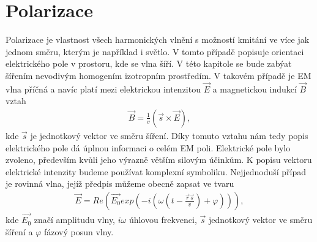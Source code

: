 \chapter{Polarizace}
Polarizace je vlastnost všech harmonických vlnění s možností kmitání ve více jak jednom směru, kterým je například i světlo. V tomto případě popisuje orientaci elektrického pole v prostoru, kde se vlna šíří. V této kapitole se bude zabýat šířením nevodivým homogením izotropním prostředím. V takovém případě je EM vlna příčná a navíc platí mezi elektrickou intenzitou $\vec{E}$ a magnetickou indukcí $\vec{B}$ vztah
\begin{eqnarray}
\vec{B}=\frac{1}{v}(\vec{s}\times\vec{E}),
\end{eqnarray}
kde $\vec{s}$ je jednotkový vektor ve směru šíření. Díky tomuto vztahu nám tedy popis elektrického pole dá úplnou informaci o celém EM poli. Elektrické pole bylo zvoleno, především kvůli jeho výrazně větším silovým účinkům.
K popisu vektoru elektrické intenzity budeme používat komplexní symboliku. Nejjednoduší případ je rovinná vlna, jejíž předpis můžeme obecně zapsat ve tvaru
\begin{eqnarray}
\vec{E}=Re(\vec{E_0}exp(-i(\omega(t-\frac{\vec{r}\vec{s}}{v})+\varphi))),
\label{rovinna vlna}
\end{eqnarray}
kde $\vec{E_0}$ značí amplitudu vlny, $i\omega$ úhlovou frekvenci, $\vec{s}$ jednotkový vektor ve směru šíření a $\varphi$ fázový posun vlny.

